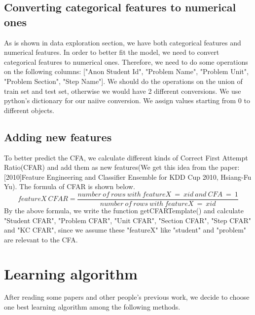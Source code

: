 \documentclass{article}
\begin{document}
\subsection{Converting categorical features to numerical ones}
As is shown in data exploration section, we have both categorical features and numerical features. In order to better fit the model, we need to convert categorical features to numerical ones. 
Therefore, we need to do some operations on the following columns: ["Anon Student Id", "Problem Name", 
"Problem Unit", "Problem Section", "Step Name"]. We should do the operations on the union of train set and test set, otherwise we would have 2 different conversions. We use python's dictionary for our naiive conversion. We assign values starting from 0 to different objects. 
\subsection{Adding new features}
To better predict the CFA, we calculate different kinds of Correct First Attempt Ratio(CFAR) and add them as new features(We get this idea from the paper: [2010]Feature Engineering and Classifier Ensemble for KDD Cup 2010, Hsiang-Fu Yu). The formula of CFAR is shown below.
$$ featureX~CFAR = \frac{number~of~rows~with~featureX~=~xid~and~CFA~=~1}{number~of~rows~with~featureX~=~xid} $$
By the above formula, we write the function getCFARTemplate() and calculate "Student CFAR", "Problem CFAR", "Unit CFAR", "Section CFAR", "Step CFAR" and "KC CFAR", since we assume these "featureX" like "student" and "problem" are relevant to the CFA.
\section{Learning algorithm}
After reading some papers and other people's previous work, we decide to choose one best learning algorithm among the following methods. 
\end{document}
